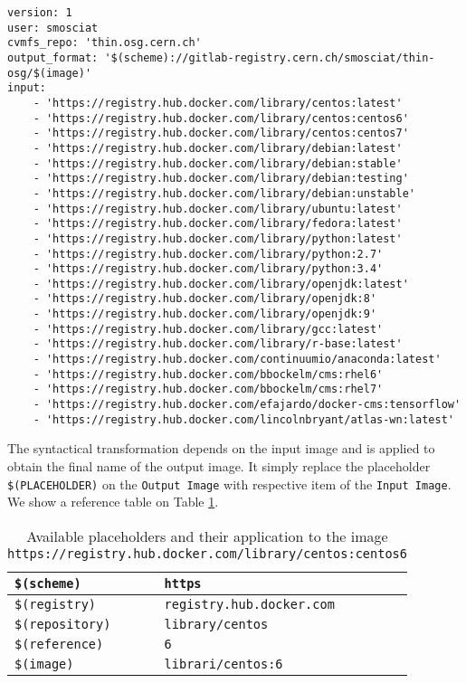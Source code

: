 \begin{minipage}{\linewidth}
\begin{lstlisting}[caption={Example of a small \textit{wish-list}},label={lst:wish-list}]
version: 1
user: smosciat
cvmfs_repo: 'thin.osg.cern.ch'
output_format: '$(scheme)://gitlab-registry.cern.ch/smosciat/thin-osg/$(image)'
input:
    - 'https://registry.hub.docker.com/library/centos:latest'
    - 'https://registry.hub.docker.com/library/centos:centos6'
    - 'https://registry.hub.docker.com/library/centos:centos7'
    - 'https://registry.hub.docker.com/library/debian:latest'
    - 'https://registry.hub.docker.com/library/debian:stable'
    - 'https://registry.hub.docker.com/library/debian:testing'
    - 'https://registry.hub.docker.com/library/debian:unstable'
    - 'https://registry.hub.docker.com/library/ubuntu:latest'
    - 'https://registry.hub.docker.com/library/fedora:latest'
    - 'https://registry.hub.docker.com/library/python:latest'
    - 'https://registry.hub.docker.com/library/python:2.7'
    - 'https://registry.hub.docker.com/library/python:3.4'
    - 'https://registry.hub.docker.com/library/openjdk:latest'
    - 'https://registry.hub.docker.com/library/openjdk:8'
    - 'https://registry.hub.docker.com/library/openjdk:9'
    - 'https://registry.hub.docker.com/library/gcc:latest'
    - 'https://registry.hub.docker.com/library/r-base:latest'
    - 'https://registry.hub.docker.com/continuumio/anaconda:latest'
    - 'https://registry.hub.docker.com/bbockelm/cms:rhel6'
    - 'https://registry.hub.docker.com/bbockelm/cms:rhel7'
    - 'https://registry.hub.docker.com/efajardo/docker-cms:tensorflow'
    - 'https://registry.hub.docker.com/lincolnbryant/atlas-wn:latest'
\end{lstlisting}
\end{minipage}

The syntactical transformation depends on the input image and is applied to
obtain the final name of the output image. It simply replace the placeholder
\texttt{\$(PLACEHOLDER)} on the \texttt{Output Image}  with respective item of
the \texttt{Input Image}. We show a reference table on Table \ref{table:placeholder}.

\begin{table}
\centering
\begin{tabular}{l|l} 
\toprule
    \texttt{\$(scheme)}     & \texttt{https}                    \\ 
\hline
    \texttt{\$(registry)}   & \texttt{registry.hub.docker.com}  \\ 
\hline
    \texttt{\$(repository)} & \texttt{library/centos}           \\ 
\hline
    \texttt{\$(reference)}  & \texttt{6}                        \\ 
\hline
    \texttt{\$(image)}      & \texttt{librari/centos:6}         \\
\bottomrule
\end{tabular}
    \caption{Available placeholders and their application to the image \texttt{https://registry.hub.docker.com/library/centos:centos6}}
\label{table:placeholder}
\end{table}

